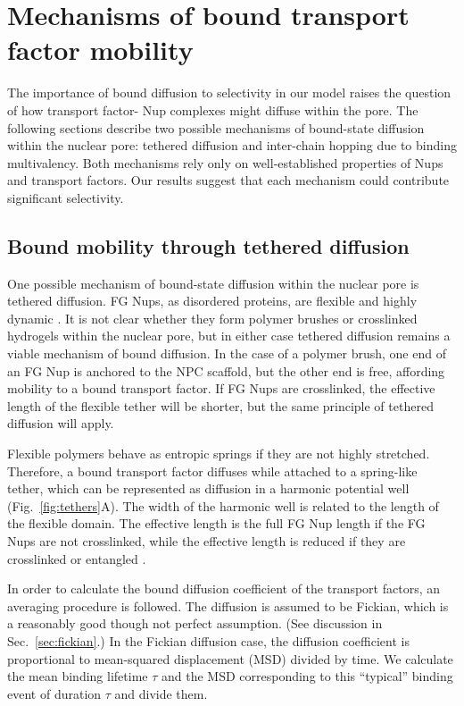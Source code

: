 \section{Mechanisms of  bound transport factor mobility}

The importance of bound diffusion to selectivity in our model raises the question of how transport factor- Nup complexes might diffuse within the pore.  The following sections describe two possible mechanisms of bound-state diffusion within the nuclear pore: tethered diffusion and inter-chain hopping due to binding multivalency.  Both mechanisms rely only on well-established properties of Nups and transport factors.  Our results suggest that each mechanism could contribute significant selectivity.

\subsection{Bound mobility through tethered diffusion}
\label{sec:tethered-diffusion}
One possible mechanism of bound-state diffusion within the nuclear pore is tethered diffusion.  FG Nups, as disordered proteins, are flexible and highly dynamic \cite{lim07, milles14, hough15,patel07}. It is not clear whether they form polymer brushes or crosslinked hydrogels within the nuclear pore, but in either case tethered diffusion remains a viable mechanism of bound diffusion.  In the case of a polymer brush, one end of an FG Nup is anchored to the NPC scaffold, but the other end is free, affording mobility to a bound transport factor.  If FG Nups are crosslinked, the effective length of the flexible tether will be shorter, but the same principle of tethered diffusion will apply.

Flexible polymers behave as entropic springs \cite{howard01} if they are not highly stretched. Therefore, a bound transport factor diffuses while attached to a spring-like tether, which can be represented as diffusion in a harmonic potential well (Fig.~\ref{fig:tethers}A).  The width of the harmonic well is related to the length of the flexible domain.  The effective length is the full FG Nup length if the FG Nups are not crosslinked, while the effective length is reduced if they are crosslinked or entangled \cite{ribbeck01}.  

In order to calculate the bound diffusion coefficient of the transport factors, an averaging procedure is followed.  The diffusion is assumed to be Fickian, which is a reasonably good though not perfect assumption. (See discussion in Sec.~\ref{sec:fickian}.)  In the Fickian diffusion case, the diffusion coefficient is proportional to mean-squared displacement (MSD) divided by time.  We calculate the mean binding lifetime $\tau$ and the MSD corresponding to this ``typical'' binding event of duration $\tau$ and divide them.

